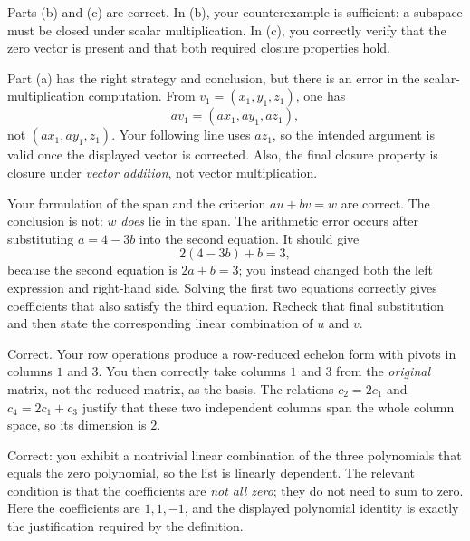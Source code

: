 
\begin{feedback}[\cref{ex:la-1}]
Parts (b) and (c) are correct.  In (b), your counterexample is sufficient: a subspace must be closed under scalar multiplication.  In (c), you correctly verify that the zero vector is present and that both required closure properties hold.

Part (a) has the right strategy and conclusion, but there is an error in the scalar-multiplication computation.  From $v_1=(x_1,y_1,z_1)$, one has
\[
  av_1=(ax_1,ay_1,az_1),
\]
not $(ax_1,ay_1,z_1)$.  Your following line uses $az_1$, so the intended argument is valid once the displayed vector is corrected.  Also, the final closure property is closure under \emph{vector addition}, not vector multiplication.
\end{feedback}

\begin{feedback}[\cref{ex:la-2}]
Your formulation of the span and the criterion $au+bv=w$ are correct.  The conclusion is not: $w$ \emph{does} lie in the span.  The arithmetic error occurs after substituting $a=4-3b$ into the second equation.  It should give
\[
  2(4-3b)+b=3,
\]
because the second equation is $2a+b=3$; you instead changed both the left expression and right-hand side.  Solving the first two equations correctly gives coefficients that also satisfy the third equation.  Recheck that final substitution and then state the corresponding linear combination of $u$ and $v$.
\end{feedback}

\begin{feedback}[\cref{ex:la-3}]
Correct.  Your row operations produce a row-reduced echelon form with pivots in columns $1$ and $3$.  You then correctly take columns $1$ and $3$ from the \emph{original} matrix, not the reduced matrix, as the basis.  The relations $c_2=2c_1$ and $c_4=2c_1+c_3$ justify that these two independent columns span the whole column space, so its dimension is $2$.
\end{feedback}

\begin{feedback}[\cref{ex:la-4}]
Correct: you exhibit a nontrivial linear combination of the three polynomials that equals the zero polynomial, so the list is linearly dependent.  The relevant condition is that the coefficients are \emph{not all zero}; they do not need to sum to zero.  Here the coefficients are $1,1,-1$, and the displayed polynomial identity is exactly the justification required by the definition.
\end{feedback}


